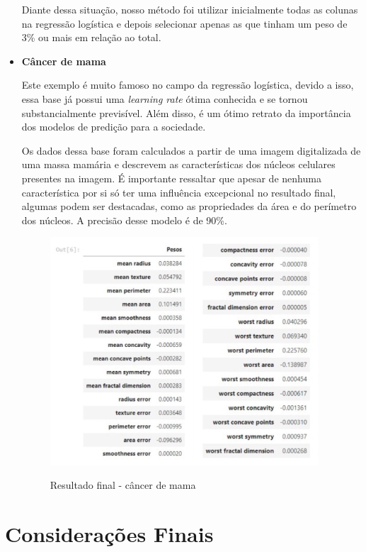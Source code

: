 \documentclass[12pt]{article}
\begin{document}
\begin{itemize}
	\hspace{0.4cm}Diante dessa situação, nosso método foi utilizar inicialmente todas as colunas na regressão logística e depois selecionar apenas as que tinham um peso de 3\% ou mais em relação ao total.

    
    \item \textbf{Câncer de mama}
    
    \hspace{0.4cm}Este exemplo é muito famoso no campo da regressão logística, devido a isso, essa base já possui uma \textit{learning rate} ótima conhecida e se tornou substancialmente previsível. Além disso, é um ótimo retrato da importância dos modelos de predição para a sociedade.
    
    \hspace{0.4cm}Os dados dessa base foram calculados a partir de uma imagem digitalizada de uma massa mamária e descrevem as características dos núcleos celulares presentes na imagem. É importante ressaltar que apesar de nenhuma característica por si só ter uma influência excepcional no resultado final, algumas podem ser destacadas, como as propriedades da área e do perímetro dos núcleos. A precisão desse modelo é de 90\%. 
    
    \begin{figure}[h]
    \caption{Resultado final - câncer de mama}
    \centering
    \includegraphics[width=10cm]{out5.jpeg}
    \label{figura:out5}
    \end{figure}
\end{itemize}

\clearpage
\section{Considerações Finais}
\end{document}

